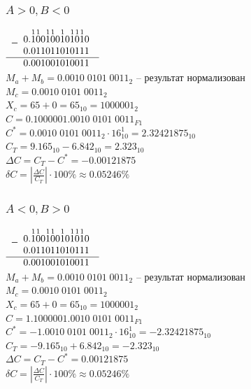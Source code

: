 \documentclass[12pt,a4paper]{report}
\begin{document}
\subsubsection*{$A>0,B<0$}
$
    \begin{array}{r}
    -
    \begin{array}{r}
    0.\overset{\small{1}}{1}\overset{\small{1}}{0}0\overset{\small{1}}{1}\overset{\small{1}}{0}0\overset{\small{1}}{1}0\overset{\small{1}}{1}\overset{\small{1}}{0}\overset{\small{1}}{1}0\\
    0.011011010111
    \end{array}\\
    \hline
    \begin{array}{r}
    0.001001010011
    \end{array}\\
    \end{array}
$\\
\hfill\break
$M_a+M_b=0.0010\;0101\;0011_2$ -- результат нормализован\\
$M_c=0.0010\;0101\;0011_2$\\
$X_c=65+0=65_{10}=1000001_2$\\
$C=0.1000001.0010\;0101\;0011_{F1}$\\
$C^*=0.0010\;0101\;0011_2\cdot16_{10}^1=2.32421875_{10}$\\
$C_T=9.165_{10}-6.842_{10}=2.323_{10}$\\
$\Delta C=C_T-C^*=-0.00121875$\\
$\delta C=|\frac{\Delta C}{C_T}|\cdot100\%\approx0.05246\%$
\subsubsection*{$A<0,B>0$}
$
    \begin{array}{r}
    -
    \begin{array}{r}
    0.\overset{\small{1}}{1}\overset{\small{1}}{0}0\overset{\small{1}}{1}\overset{\small{1}}{0}0\overset{\small{1}}{1}0\overset{\small{1}}{1}\overset{\small{1}}{0}\overset{\small{1}}{1}0\\
    0.011011010111
    \end{array}\\
    \hline
    \begin{array}{r}
    0.001001010011
    \end{array}\\
    \end{array}
$\\
\hfill\break
$M_a+M_b=0.0010\;0101\;0011_2$ -- результат нормализован\\
$M_c=0.0010\;0101\;0011_2$\\
$X_c=65+0=65_{10}=1000001_2$\\
$C=1.1000001.0010\;0101\;0011_{F1}$\\
$C^*=-1.0010\;0101\;0011_2\cdot16_{10}^1=-2.32421875_{10}$\\
$C_T=-9.165_{10}+6.842_{10}=-2.323_{10}$\\
$\Delta C=C_T-C^*=0.00121875$\\
$\delta C=|\frac{\Delta C}{C_T}|\cdot100\%\approx0.05246\%$
\end{document}
